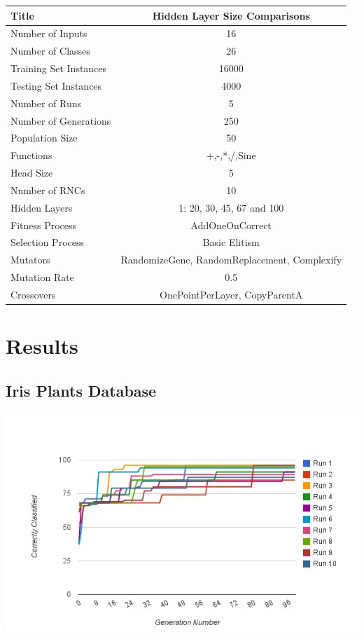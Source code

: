 \documentclass[a4paper,11pt]{report}
\begin{document}
\begin{tabular}{| l | c |}
 \hline
 Title & Hidden Layer Size Comparisons \\
 \hline
 Number of Inputs & 16 \\
 Number of Classes & 26 \\
 Training Set Instances & 16000 \\
 Testing Set Instances & 4000 \\
 Number of Runs & 5 \\
 Number of Generations & 250 \\
 Population Size & 50 \\
 Functions & +,-,*,/,Sine \\
 Head Size & 5 \\
 Number of RNCs & 10 \\
 Hidden Layers & 1: 20, 30, 45, 67 and 100 \\
 Fitness Process & AddOneOnCorrect \\
 Selection Process & Basic Elitism \\
 Mutators & RandomizeGene, RandomReplacement, Complexify \\
 Mutation Rate & 0.5 \\
 Crossovers & OnePointPerLayer, CopyParentA \\ 
 \hline
\end{tabular}

\chapter{Results}

\section{Iris Plants Database}

\begin{center}
 \includegraphics[width=400pt,keepaspectratio=true]{./Report/Iris-Chart.png}
\end{center}
\end{document}
